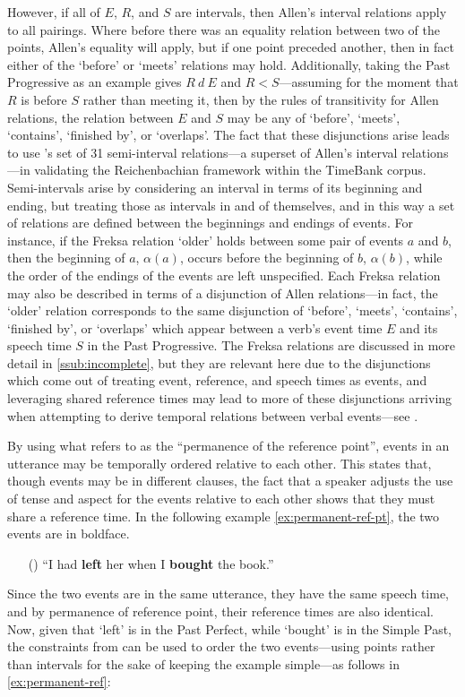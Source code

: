 \documentclass[a4paper,12pt,leqno]{article}
\newcommand{\ipp}{(\refstepcounter{equation}\theequation)}
\begin{document}
However, if all of $E$, $R$, and $S$ are intervals, then Allen's interval relations apply to all pairings. Where before there was an equality relation between two of the points, Allen's equality will apply, but if one point preceded another, then in fact either of the `before' or `meets' relations may hold. Additionally, taking the Past Progressive as an example gives $R ~d~ E$ and $R < S$---assuming for the moment that $R$ is before $S$ rather than meeting it, then by the rules of transitivity for Allen relations, the relation between $E$ and $S$ may be any of `before', `meets', `contains', `finished by', or `overlaps'. The fact that these disjunctions arise leads \citet{Derczynski2013} to use \citet{Freksa1992}'s set of 31 semi-interval relations---a superset of Allen's interval relations---in validating the Reichenbachian framework within the TimeBank \citep{pustejovsky2006timebank} corpus. Semi-intervals arise by considering an interval in terms of its beginning and ending, but treating those as intervals in and of themselves, and in this way a set of relations are defined between the beginnings and endings of events. For instance, if the Freksa relation `older' holds between some pair of events $a$ and $b$, then the beginning of $a$, $\alpha(a)$, occurs before the beginning of $b$, $\alpha(b)$, while the order of the endings of the events are left unspecified. Each Freksa relation may also be described in terms of a disjunction of Allen relations---in fact, the `older' relation corresponds to the same disjunction of `before', `meets', `contains', `finished by', or `overlaps' which appear between a verb's event time $E$ and its speech time $S$ in the Past Progressive. The Freksa relations are discussed in more detail in \cref{ssub:incomplete}, but they are relevant here due to the disjunctions which come out of treating event, reference, and speech times as events, and leveraging shared reference times may lead to more of these disjunctions arriving when attempting to derive temporal relations between verbal events---see .

By using what \citet[p. 74]{reichenbach1947elements} refers to as the ``permanence of the reference point'', events in an utterance may be temporally ordered relative to each other. This states that, though events may be in different clauses, the fact that a speaker adjusts the use of tense and aspect for the events relative to each other shows that they must share a reference time. In the following example \cref{ex:permanent-ref-pt}, the two events are in boldface.
\begin{itemize}
	\item[\ipp\label{ex:permanent-ref-pt}] ``I had \textbf{left} her when I \textbf{bought} the book.''
\end{itemize}
Since the two events are in the same utterance, they have the same speech time, and by permanence of reference point, their reference times are also identical. Now, given that `left' is in the Past Perfect, while `bought' is in the Simple Past, the constraints from  can be used to order the two events---using points rather than intervals for the sake of keeping the example simple---as follows in \cref{ex:permanent-ref}:
\end{document}
